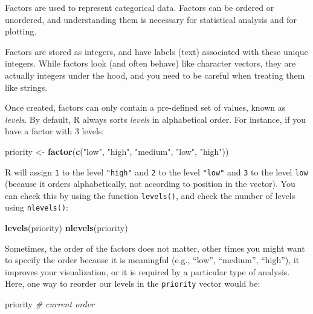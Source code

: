 \documentclass[
]{book}
\newenvironment{Shaded}{\begin{snugshade}}{\end{snugshade}}
\newcommand{\CommentTok}[1]{\textcolor[rgb]{0.56,0.35,0.01}{\textit{#1}}}
\newcommand{\FunctionTok}[1]{\textcolor[rgb]{0.13,0.29,0.53}{\textbf{#1}}}
\newcommand{\NormalTok}[1]{#1}
\newcommand{\OtherTok}[1]{\textcolor[rgb]{0.56,0.35,0.01}{#1}}
\newcommand{\StringTok}[1]{\textcolor[rgb]{0.31,0.60,0.02}{#1}}
\begin{document}
Factors are used to represent categorical data. Factors can be ordered or
unordered, and understanding them is necessary for statistical analysis and for
plotting.

Factors are stored as integers, and have labels (text) associated with these
unique integers. While factors look (and often behave) like character vectors,
they are actually integers under the hood, and you need to be careful when
treating them like strings.

Once created, factors can only contain a pre-defined set of values, known as
\emph{levels}. By default, R always sorts \emph{levels} in alphabetical order. For
instance, if you have a factor with 3 levels:

\begin{Shaded}
\begin{Highlighting}[]
\NormalTok{priority }\OtherTok{\textless{}{-}} \FunctionTok{factor}\NormalTok{(}\FunctionTok{c}\NormalTok{(}\StringTok{"low"}\NormalTok{, }\StringTok{"high"}\NormalTok{, }\StringTok{"medium"}\NormalTok{, }\StringTok{"low"}\NormalTok{, }\StringTok{"high"}\NormalTok{))}
\end{Highlighting}
\end{Shaded}

R will assign \texttt{1} to the level \texttt{"high"} and \texttt{2} to the level \texttt{"low"} and \texttt{3} to the level \texttt{low} (because it orders alphabetically, not according to position in the vector). You can check this by using the function \texttt{levels()}, and check the number of levels using \texttt{nlevels()}:

\begin{Shaded}
\begin{Highlighting}[]
\FunctionTok{levels}\NormalTok{(priority)}
\FunctionTok{nlevels}\NormalTok{(priority)}
\end{Highlighting}
\end{Shaded}

Sometimes, the order of the factors does not matter, other times you might want
to specify the order because it is meaningful (e.g., ``low'', ``medium'', ``high''),
it improves your visualization, or it is required by a particular type of
analysis. Here, one way to reorder our levels in the \texttt{priority} vector would be:

\begin{Shaded}
\begin{Highlighting}[]
\NormalTok{priority }\CommentTok{\# current order}
\end{Highlighting}
\end{Shaded}
\end{document}
